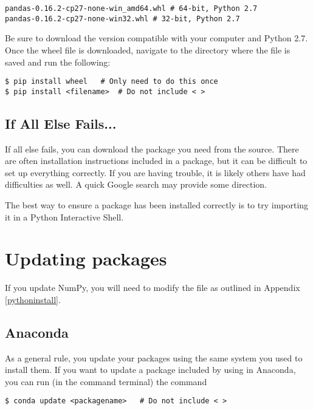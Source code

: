 \begin{lstlisting}
pandas-0.16.2-cp27-none-win_amd64.whl # 64-bit, Python 2.7
pandas-0.16.2-cp27-none-win32.whl # 32-bit, Python 2.7
\end{lstlisting}

Be sure to download the version compatible with your computer and Python 2.7. Once the wheel file is downloaded, navigate to the directory where the file is saved and run the following:

\begin{lstlisting}
$ pip install wheel   # Only need to do this once
$ pip install <filename>  # Do not include < >
\end{lstlisting}

\subsection*{If All Else Fails...}
If all else fails, you can download the package you need from the source. There are often installation instructions included in a package, but it can be difficult to set up everything correctly. If you are having trouble, it is likely others have had difficulties as well. A quick Google search may provide some direction.

\begin{info}
The best way to ensure a package has been installed correctly is to try importing it in a Python Interactive Shell.
\end{info}

\section*{Updating packages}

\begin{info}
If you update NumPy, you will need to modify the file  as outlined in Appendix \ref{pythoninstall}.
\end{info}

\subsection*{Anaconda}
As a general rule, you update your packages using the same system you used to install them.
If you want to update a package included by using in Anaconda, you can run (in the command terminal) the command
\begin{lstlisting}
$ conda update <packagename>   # Do not include < >
\end{lstlisting}


